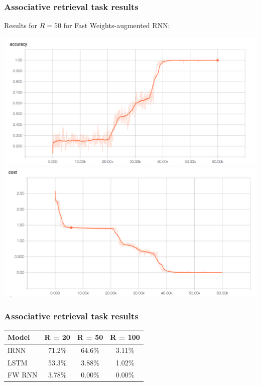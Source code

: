 \documentclass{beamer}
\begin{document}
\begin{frame}
  \frametitle{Associative retrieval task results}

  Results for $R = 50$ for Fast Weights-augmented RNN:
  \begin{center}
  \includegraphics[scale=0.20]{../final/images/fast_weight_r_50_accuracy.png} \\
  \includegraphics[scale=0.20]{../final/images/fast_weight_r_50_cost.png}
  \end{center}
\end{frame}

\begin{frame}
  \frametitle{Associative retrieval task results}
  \begin{center}
    \begin{tabular}{lccc}
      Model & R = 20 & R = 50 & R = 100 \\
      \hline
      IRNN & 71.2\% & 64.6\% & 3.11\% \\
      LSTM & 53.3\% & 3.88\% & 1.02\% \\
      FW RNN & 3.78\% & 0.00\% & 0.00\%
    \end{tabular}
  \end{center}

\end{frame}

\end{document}
